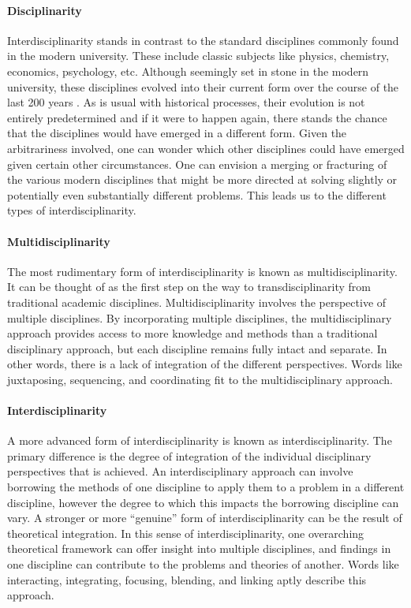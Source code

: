 \documentclass[a4paper]{article}
\begin{document}
\paragraph{Disciplinarity}

Interdisciplinarity stands in contrast to the standard disciplines commonly
found in the modern university. These include classic subjects like physics,
chemistry, economics, psychology, etc. Although seemingly set in stone in the
modern university, these disciplines evolved into their current form over the
course of the last 200 years \cite{weingart2010short}. As is usual with
historical processes, their evolution is not entirely predetermined and if it
were to happen again, there stands the chance that the disciplines would have
emerged in a different form. Given the arbitrariness involved, one can wonder
which other disciplines could have emerged given certain other circumstances.
One can envision a merging or fracturing of the various modern disciplines
that might be more directed at solving slightly or potentially even
substantially different problems. This leads us to the different types of
interdisciplinarity.

\paragraph{Multidisciplinarity}

The most rudimentary form of interdisciplinarity is known as
multidisciplinarity. It can be thought of as the first step on the way to
transdisciplinarity from traditional academic disciplines.
Multidisciplinarity involves the perspective of multiple disciplines. By
incorporating multiple disciplines, the multidisciplinary approach provides
access to more knowledge and methods than a traditional disciplinary approach,
but each discipline remains fully intact and separate. In other words, there
is a lack of integration of the different perspectives. Words like
juxtaposing, sequencing, and coordinating fit to the multidisciplinary
approach. 

\paragraph{Interdisciplinarity}

A more advanced form of interdisciplinarity is known as interdisciplinarity.
The primary difference is the degree of integration of the individual
disciplinary perspectives that is achieved. An interdisciplinary approach can
involve borrowing the methods of one discipline to apply them to a problem in
a different discipline, however the degree to which this impacts the borrowing
discipline can vary. A stronger or more ``genuine'' form of
interdisciplinarity can be the result of theoretical integration. In this
sense of interdisciplinarity, one overarching theoretical framework can offer
insight into multiple disciplines, and findings in one discipline can
contribute to the problems and theories of another. Words like interacting,
integrating, focusing, blending, and linking aptly describe this approach. 
\end{document}
